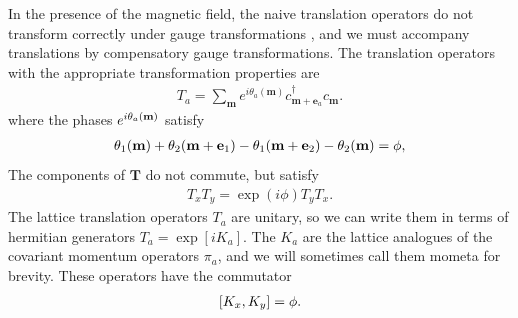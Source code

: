 \documentclass[aps,prb,twocolumn,letterpaper,twoside,nobalancelastpage,groupedaddress,amsmath,amssymb,floatfix,citeautoscript]{revtex4-1}
\begin{document}
In the presence of the magnetic field, the naive translation operators do not transform correctly under gauge transformations \cite{fradkin_field_2013}, and we must accompany translations by compensatory gauge transformations. The translation operators with the appropriate transformation properties are
\begin{align*}
T_a = \sum_{\mathbf{m}} e^{i\theta_a(\mathbf{m})} c^{\dag}_{\mathbf{m} + \mathbf{e}_a}c_{\mathbf{m}}.
\end{align*}
where the phases $e^{i\theta_a(\mathbf{m})}$ satisfy 
\begin{align*}
\theta_1(\mathbf{m}) + \theta_2(\mathbf{m} + \mathbf{e}_1) - \theta_1(\mathbf{m} + \mathbf{e}_2) - \theta_2(\mathbf{m}) = \phi,
\end{align*}
The components of $\mathbf{T}$ do not commute, but satisfy 
\begin{align*}
T_x T_y = \exp(i\phi) T_y T_x.
\end{align*}
The lattice translation operators $T_a$ are unitary, so we can write them in terms of hermitian generators $T_a = \exp\left[i K_a\right]$. The $K_a$ are the lattice analogues of the covariant momentum operators $\pi_a$, and we will sometimes call them mometa for brevity. These operators have the commutator
\begin{align*}
\comm{K_x}{K_y} = \phi.
\end{align*}

\end{document}
